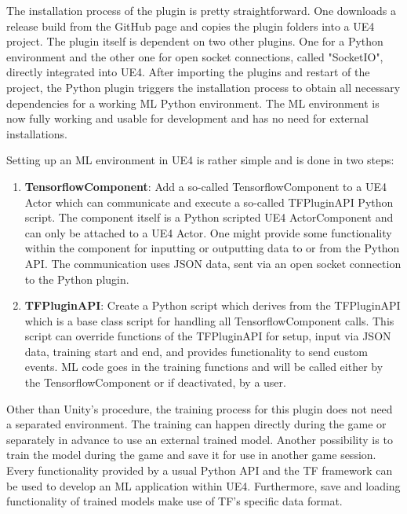 \documentclass[MGS,Master,english]{twbook}%
\begin{document}
The installation process of the plugin is pretty straightforward. One downloads a release build from the GitHub page and copies the plugin folders into a \ac{UE4} project. The plugin itself is dependent on two other plugins. One for a Python environment and the other one for open socket connections, called "SocketIO", directly integrated into \ac{UE4}. After importing the plugins and restart of the project, the Python plugin triggers the installation process to obtain all necessary dependencies for a working \ac{ML} Python environment. The \ac{ML} environment is now fully working and usable for development and has no need for external installations.

Setting up an \ac{ML} environment in \ac{UE4} is rather simple and is done in two steps:
\begin{enumerate}
	\item \textbf{TensorflowComponent}: Add a so-called TensorflowComponent to a \ac{UE4} Actor which can communicate and execute a so-called TFPluginAPI Python script. The component itself is a Python scripted \ac{UE4} ActorComponent and can only be attached to a \ac{UE4} Actor. One might provide some functionality within the component for inputting or outputting data to or from the Python \ac{API}. The communication uses \ac{JSON} data, sent via an open socket connection to the Python plugin.
	\item \textbf{TFPluginAPI}: Create a Python script which derives from the TFPluginAPI which is a base class script for handling all TensorflowComponent calls. This script can override functions of the TFPluginAPI for setup, input via \ac{JSON} data, training start and end, and provides functionality to send custom events. \ac{ML} code goes in the training functions and will be called either by the TensorflowComponent or if deactivated, by a user.
\end{enumerate}

Other than Unity’s procedure, the training process for this plugin does not need a separated environment. The training can happen directly during the game or separately in advance to use an external trained model. Another possibility is to train the model during the game and save it for use in another game session. Every functionality provided by a usual Python \ac{API} and the \ac{TF} framework can be used to develop an \ac{ML} application within \ac{UE4}. Furthermore, save and loading functionality of trained models make use of \ac{TF}'s specific data format.
\end{document}
